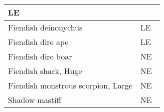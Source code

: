\begin{longtable}{llll}
{\begin{minipage}[t]{0.601in}
LE\end{minipage}}\\
\hline
\multicolumn{1}{|p{3.326in}|}{\begin{minipage}[t]{3.326in}\raggedright
Fiendish deinonychus\end{minipage}} & \multicolumn{3}{p{0.601in}|}{\begin{minipage}[t]{0.601in}\raggedright
LE\end{minipage}}\\
\hline
\multicolumn{1}{|p{3.326in}|}{\begin{minipage}[t]{3.326in}\raggedright
Fiendish dire ape\end{minipage}} & \multicolumn{3}{p{0.601in}|}{\begin{minipage}[t]{0.601in}\raggedright
LE\end{minipage}}\\
\hline
\multicolumn{1}{|p{3.326in}|}{\begin{minipage}[t]{3.326in}\raggedright
Fiendish dire boar\end{minipage}} & \multicolumn{3}{p{0.601in}|}{\begin{minipage}[t]{0.601in}\raggedright
NE\end{minipage}}\\
\hline
\multicolumn{1}{|p{3.326in}|}{\begin{minipage}[t]{3.326in}\raggedright
Fiendish shark, Huge\end{minipage}} & \multicolumn{3}{p{0.601in}|}{\begin{minipage}[t]{0.601in}\raggedright
NE\end{minipage}}\\
\hline
\multicolumn{1}{|p{3.326in}|}{\begin{minipage}[t]{3.326in}\raggedright
Fiendish monstrous scorpion, Large\end{minipage}} & \multicolumn{3}{p{0.601in}|}{\begin{minipage}[t]{0.601in}\raggedright
NE\end{minipage}}\\
\hline
\multicolumn{1}{|p{3.326in}|}{\begin{minipage}[t]{3.326in}\raggedright
Shadow mastiff\end{minipage}} & \multicolumn{3}{p{0.601in}|}{\begin{minipage}[t]{0.601in}\raggedright
NE\end{minipage}}\\
\hline

\end{longtable}
